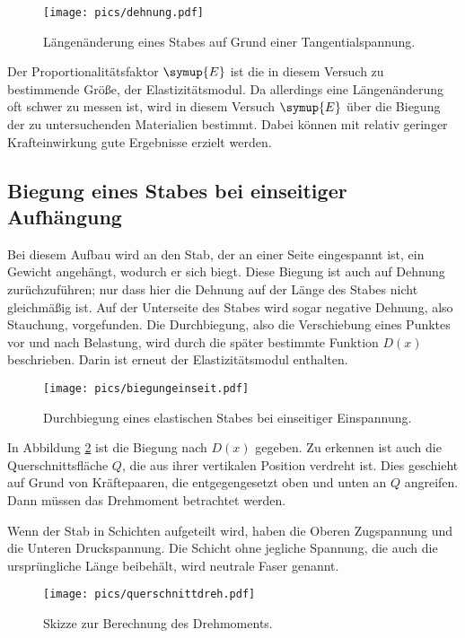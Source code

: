 \begin{figure}[h]
  \centering
  \texttt{[image: pics/dehnung.pdf]}
  \caption{Längenänderung eines Stabes auf Grund einer Tangentialspannung\cite{anleitung}.}
  \label{fig:dehnung}
\end{figure}

Der Proportionalitätsfaktor $\symup{E}$ ist die in diesem Versuch zu bestimmende
Größe, der Elastizitätsmodul.
Da allerdings eine Längenänderung oft schwer zu messen ist, wird in diesem
Versuch $\symup{E}$ über die Biegung der zu untersuchenden Materialien bestimmt.
Dabei können mit relativ geringer Krafteinwirkung gute Ergebnisse erzielt werden.

\subsection{Biegung eines Stabes bei einseitiger Aufhängung}

Bei diesem Aufbau wird an den Stab, der an einer Seite eingespannt ist,
 ein Gewicht angehängt, wodurch er sich
biegt. Diese Biegung ist auch auf Dehnung zurüchzuführen; nur dass hier die
Dehnung auf der Länge des Stabes nicht gleichmäßig ist. Auf der Unterseite des
Stabes wird sogar negative Dehnung, also Stauchung, vorgefunden. Die Durchbiegung,
also die Verschiebung eines Punktes vor und nach Belastung, wird durch die
später bestimmte Funktion $D(x)$ beschrieben. Darin ist erneut der Elastizitätsmodul
enthalten.

\begin{figure}[h]
  \centering
  \texttt{[image: pics/biegungeinseit.pdf]}
  \caption{Durchbiegung eines elastischen Stabes bei einseitiger Einspannung\cite{anleitung}.}
  \label{fig:biegungeinseit}
\end{figure}

In Abbildung \ref{fig:biegungeinseit} ist die Biegung nach $D(x)$ gegeben. Zu
erkennen ist auch die Querschnittsfläche $Q$, die aus ihrer vertikalen Position
verdreht ist. Dies geschieht auf Grund von Kräftepaaren, die entgegengesetzt
oben und unten an $Q$ angreifen. Dann müssen das Drehmoment betrachtet werden.

Wenn der Stab in Schichten aufgeteilt wird, haben die Oberen Zugspannung und die
Unteren Druckspannung. Die Schicht ohne jegliche Spannung, die auch die
ursprüngliche Länge beibehält, wird neutrale Faser genannt.

\begin{figure}[h]
  \centering
  \texttt{[image: pics/querschnittdreh.pdf]}
  \caption{Skizze zur Berechnung des Drehmoments\cite{anleitung}.}
  \label{fig:querschnittdreh}
\end{figure}

